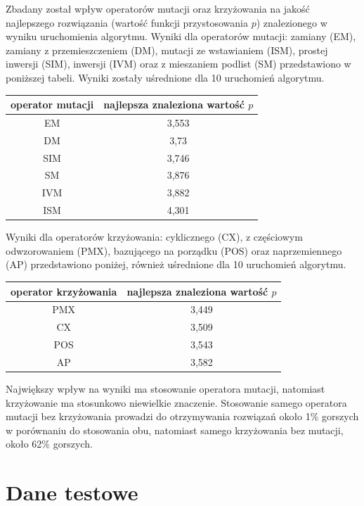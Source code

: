 \documentclass{xmgr}
\begin{document}
Zbadany został wpływ operatorów mutacji oraz krzyżowania na jakość najlepszego rozwiązania (wartość funkcji przystosowania $p$) znalezionego w wyniku uruchomienia algorytmu. Wyniki dla operatorów mutacji: zamiany (EM), zamiany z przemieszczeniem (DM), mutacji ze wstawianiem (ISM), prostej inwersji (SIM), inwersji (IVM) oraz z mieszaniem podlist (SM) przedstawiono w poniższej tabeli. Wyniki zostały uśrednione dla 10 uruchomień algorytmu.
\newline\newline
\begin{tabular}{ c | c }
  operator mutacji & najlepsza znaleziona wartość $p$ \\
  \hline
  EM  & 3,553 \\
  DM  & 3,73 \\
  SIM & 3,746 \\
  SM  & 3,876 \\
  IVM & 3,882 \\
  ISM & 4,301 \\
\end{tabular}\newline

Wyniki dla operatorów krzyżowania: cyklicznego (CX), z częściowym odwzorowaniem (PMX), bazującego na porządku (POS) oraz naprzemiennego (AP) przedstawiono poniżej, również uśrednione dla 10 uruchomień algorytmu.
\newline\newline
\begin{tabular}{ c | c }
  operator krzyżowania & najlepsza znaleziona wartość $p$ \\
  \hline
  PMX & 3,449 \\
  CX  & 3,509 \\
  POS & 3,543 \\
  AP  & 3,582 \\
\end{tabular}\newline

Największy wpływ na wyniki ma stosowanie operatora mutacji, natomiast krzyżowanie ma stosunkowo niewielkie znaczenie. Stosowanie samego operatora mutacji bez krzyżowania prowadzi do otrzymywania rozwiązań około 1\% gorszych w porównaniu do stosowania obu, natomiast samego krzyżowania bez mutacji, około 62\% gorszych.



\section{Dane testowe}
\end{document}
